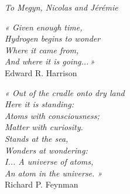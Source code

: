 


\emptypage

\thispagestyle{empty}

\vspace*{-1.5cm}

\hspace*{0.34\textwidth} {\LARGE \emph{To Megyn, Nicolas and Jérémie}}\\

\vspace*{6.5cm}
\hspace*{0.55\textwidth}
\begin{minipage}{0.40\textwidth}
\emph{« Given enough time,\\
\hspace*{0.3cm}Hydrogen begins to wonder\\
\hspace*{0.3cm}Where it came from,\\
\hspace*{0.3cm}And where it is going...\,»}\\
\vspace*{0.4cm}
\hspace*{1cm}Edward R. Harrison\\
\end{minipage}

\vspace*{2.0cm}

\hspace*{0.55\textwidth}
\begin{minipage}{0.40\textwidth}
\emph{« Out of the cradle onto dry land\\
\hspace*{0.3cm}Here it is standing:\\
\hspace*{0.3cm}Atoms with consciousness;\\
\hspace*{0.3cm}Matter with curiosity.\\
\newline
\hspace*{0.3cm}Stands at the sea,\\
\hspace*{0.3cm}Wonders at wondering:\\
\hspace*{0.3cm}I... A universe of atoms,\\
\hspace*{0.3cm}An atom in the universe. »}\\
\vspace*{0.4cm}
\hspace*{1cm}Richard P. Feynman
\end{minipage}

